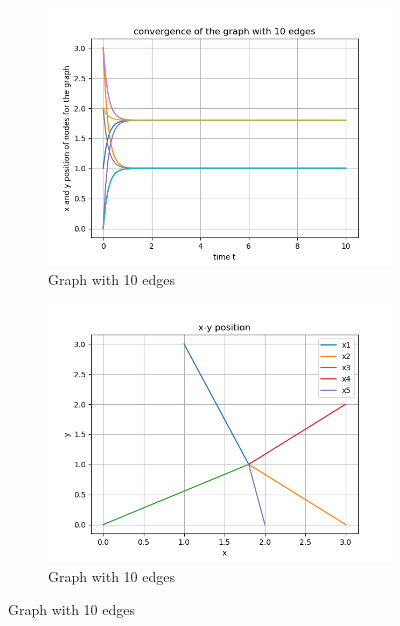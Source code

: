 \documentclass{article}
\begin{document}
\begin{problem}
\begin{figure}
\begin{subfigure}{0.4\textwidth}
            \includegraphics[width=\textwidth]{./img/Figure_11.png}
            \caption{Graph with 10 edges}
        \end{subfigure}
        \begin{subfigure}{0.4\textwidth}
            \includegraphics[width=\textwidth]{./img/Figure_12.png}
            \caption{Graph with 10 edges}
        \end{subfigure}


\end{figure}
\end{problem}
\end{document}

